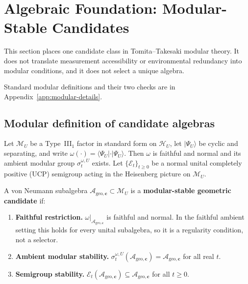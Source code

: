 \section{Algebraic Foundation: Modular-Stable Candidates}
\label{sec:modular}

This section places one candidate class in Tomita--Takesaki modular theory. It does not translate measurement accessibility or environmental redundancy into modular conditions, and it does not select a unique algebra.

Standard modular definitions and their two checks are in Appendix~\ref{app:modular-details}.

\subsection{Modular definition of candidate algebras}
\label{sec:modular-def}

Let $\mathcal M_U$ be a Type~III$_1$ factor in standard form on $\mathcal H_U$, let $|\Psi_U\rangle$ be cyclic and separating, and write $\omega(\cdot)=\langle\Psi_U|\cdot|\Psi_U\rangle$. Then $\omega$ is faithful and normal and its ambient modular group $\sigma_t^{\omega,U}$ exists. Let $\{\mathcal E_t\}_{t\ge0}$ be a normal unital completely positive (UCP) semigroup acting in the Heisenberg picture on $\mathcal M_U$.

\begin{definition}
\label{def:modular-accessible}
A von Neumann subalgebra $\mathcal{A}_{\mathrm{geo},\mathbf{c}}\subset\mathcal M_U$ is a \textbf{modular-stable geometric candidate} if:
\begin{enumerate}
\item[\textup{(U1)}] \textbf{Faithful restriction.} $\omega|_{\mathcal{A}_{\mathrm{geo},\mathbf{c}}}$ is faithful and normal. In the faithful ambient setting this holds for every unital subalgebra, so it is a regularity condition, not a selector.
\item[\textup{(U2)}] \textbf{Ambient modular stability.} $\sigma_t^{\omega,U}(\mathcal{A}_{\mathrm{geo},\mathbf{c}})=\mathcal{A}_{\mathrm{geo},\mathbf{c}}$ for all real $t$.
\item[\textup{(U3)}] \textbf{Semigroup stability.} $\mathcal E_t(\mathcal{A}_{\mathrm{geo},\mathbf{c}})\subseteq\mathcal{A}_{\mathrm{geo},\mathbf{c}}$ for all $t\ge0$.
\end{enumerate}
\end{definition}

